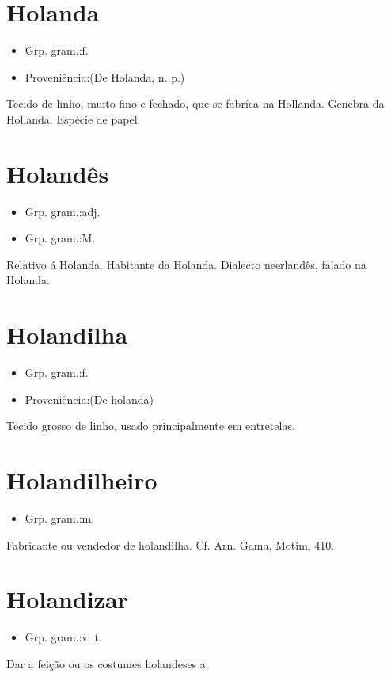 \documentclass{article}
\begin{document}
\section{Holanda}
\begin{itemize}
\item {Grp. gram.:f.}
\end{itemize}
\begin{itemize}
\item {Proveniência:(De \textunderscore Holanda\textunderscore , n. p.)}
\end{itemize}
Tecido de linho, muito fino e fechado, que se fabríca na Hollanda.
Genebra da Hollanda.
Espécie de papel.
\section{Holandês}
\begin{itemize}
\item {Grp. gram.:adj.}
\end{itemize}
\begin{itemize}
\item {Grp. gram.:M.}
\end{itemize}
Relativo á Holanda.
Habitante da Holanda.
Dialecto neerlandês, falado na Holanda.
\section{Holandilha}
\begin{itemize}
\item {Grp. gram.:f.}
\end{itemize}
\begin{itemize}
\item {Proveniência:(De \textunderscore holanda\textunderscore )}
\end{itemize}
Tecido grosso de linho, usado principalmente em entretelas.
\section{Holandilheiro}
\begin{itemize}
\item {Grp. gram.:m.}
\end{itemize}
Fabricante ou vendedor de holandilha. Cf. Arn. Gama, \textunderscore Motim\textunderscore , 410.
\section{Holandizar}
\begin{itemize}
\item {Grp. gram.:v. t.}
\end{itemize}
Dar a feição ou os costumes holandeses a.
\end{document}
